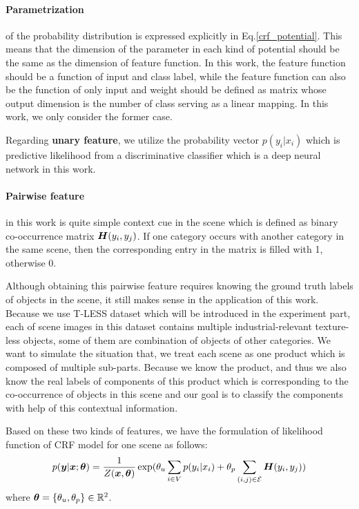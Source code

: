 \paragraph{Parametrization} of the probability distribution is expressed explicitly in Eq.\ref{crf_potential}. This means that the dimension of the parameter in each kind of potential should be the same as the dimension of feature function. In this work, the feature function should be a function of input and class label, while the feature function can also be the function of only input and weight should be defined as matrix whose output dimension is the number of class serving as a linear mapping. In this work, we only consider the former case.

Regarding \textbf{unary feature}, we utilize the probability vector $p(y_i|x_i)$ which is predictive likelihood from a discriminative classifier which is a deep neural network in this work. 

\paragraph{Pairwise feature} in this work is quite simple context cue in the scene which is defined as binary co-occurrence matrix $\boldsymbol H(y_i,y_j)$. If one category occurs with another category in the same scene, then the corresponding entry in the matrix is filled with 1, otherwise 0. 

Although obtaining this pairwise feature requires knowing the ground truth labels of objects in the scene, it still makes sense in the application of this work. Because we use T-LESS dataset which will be introduced in the experiment part, each of scene images in this dataset contains multiple industrial-relevant texture-less objects, some of them are combination of objects of other categories. We want to simulate the situation that, we treat each scene as one product which is composed of multiple sub-parts. Because we know the product, and thus we also know the real labels of components of this product which is corresponding to the co-occurrence of objects in this scene and our goal is to classify the components with help of this contextual information.

Based on these two kinds of features, we have the formulation of likelihood function of \gls{CRF} model for one scene as follows:
\begin{equation}
\label{crf_used}
p(\boldsymbol y|\boldsymbol x; \boldsymbol \theta) = \frac{1}{Z(\boldsymbol x, \boldsymbol \theta)}\exp(\theta_u\sum_{i\in V}p(y_i|x_i) + \theta_p\sum_{(i,j)\in \mathcal{E}}\boldsymbol H(y_i,y_j))
\end{equation}
where $\boldsymbol \theta = \{\theta_u, \theta_p\} \in \mathbb{R}^2$.

